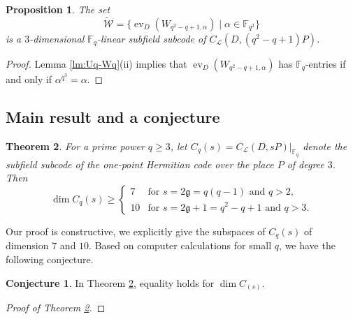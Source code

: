 \documentclass[11pt]{amsart}
\theoremstyle{plain}
\newtheorem{theorem}{Theorem}[section]
\newtheorem{proposition}[theorem]{Proposition}
\theoremstyle{definition}
\newtheorem{conjecture}{Conjecture}[section]
\theoremstyle{remark}
\newcommand{\g}{\mathfrak{g}}
\DeclareMathOperator{\ev}{ev}
\begin{document}
\begin{proposition}
The set 
\[\widetilde{\mathcal{W}} = \{\ev_D(W_{q^2-q+1, \alpha}) \mid \alpha \in \mathbb{F}_{q^3}\}\]
is a $3$-dimensional $\mathbb{F}_q$-linear subfield subcode of $C_\mathcal{L}(D,(q^2-q+1)P)$.
\end{proposition}
\begin{proof}
Lemma \ref{lm:Uq-Wq}(ii) implies that $\ev_D(W_{q^2-q+1,\alpha})$ has $\mathbb{F}_q$-entries if and only if $\alpha^{q^3}=\alpha$. 
\end{proof}




\subsection{Main result and a conjecture}

\begin{theorem} \label{th:subcodes-dim}
	For a prime power $q \geq 3$, let $C_q (s)=C_{\mathcal{L}}( D,sP)|_{\mathbb{F}_q}$ denote the subfield subcode of the one-point Hermitian code over the place $P$ of degree $3$. Then 
	\[ \dim C_{q}(s)\geq \begin{cases} 
		7 & \text {for $s=2\mathfrak{g}=q(q-1)$ and $q>2$,} \\ 
		10 & \text{for $s=2\g +1=q^2-q+1$ and $q>3$.}
	\end{cases}\]
\end{theorem}

Our proof is constructive, we explicitly give the subspaces of $C_q(s)$ of dimension $7$ and $10$. Based on computer calculations for small $q$, we have the following conjecture. 

\begin{conjecture} 
	In Theorem \ref{th:subcodes-dim}, equality holds for $\dim C_(s)$. 
\end{conjecture}

\begin{proof}[Proof of Theorem \ref{th:subcodes-dim}]

\end{proof}
\end{document}
